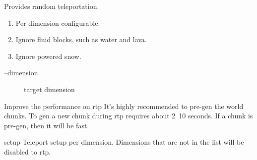 
Provides random teleportation.

\begin{enumerate}
    \item Per dimension configurable.
    \item Ignore fluid blocks, such as water and lava.
    \item Ignore powered snow.
\end{enumerate}

\begin{description}
    \item [--dimension] target dimension
\end{description}

\begin{tips}{Improve the performance on rtp}
    It's highly recommended to pre-gen the world chunks.
    To gen a new chunk during rtp requires about 2~10 seconds.
    If a chunk is pre-gen, then it will be fast.
\end{tips}

\begin{Configuration}
    \item[setup]{
        Teleport setup per dimension.
        Dimensions that are not in the list will be disabled to rtp.
    }
\end{Configuration}




